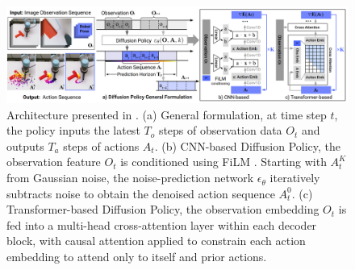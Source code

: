 \begin{figure}[t]
    \centering
    \includegraphics[width=\textwidth]{figures/images/diffusion_policy/diffusion_model.png}
    \caption{Architecture presented in \cite{cheng2023diffusion}. (a) General formulation, at time step $t$, the policy inputs the latest $T_o$ steps of observation data $O_t$ and outputs $T_a$ steps of actions $A_t$. (b) CNN-based Diffusion Policy, the observation feature $O_t$ is conditioned using FiLM \cite{perez2018film}. Starting with $A_t^K$ from Gaussian noise, the noise-prediction network $\epsilon_\theta$ iteratively subtracts noise to obtain the denoised action sequence $A_t^0$. (c) Transformer-based Diffusion Policy, the observation embedding $O_t$ is fed into a multi-head cross-attention layer within each decoder block, with causal attention applied to constrain each action embedding to attend only to itself and prior actions.}
    \label{fig:diffusion_model}
\end{figure}
